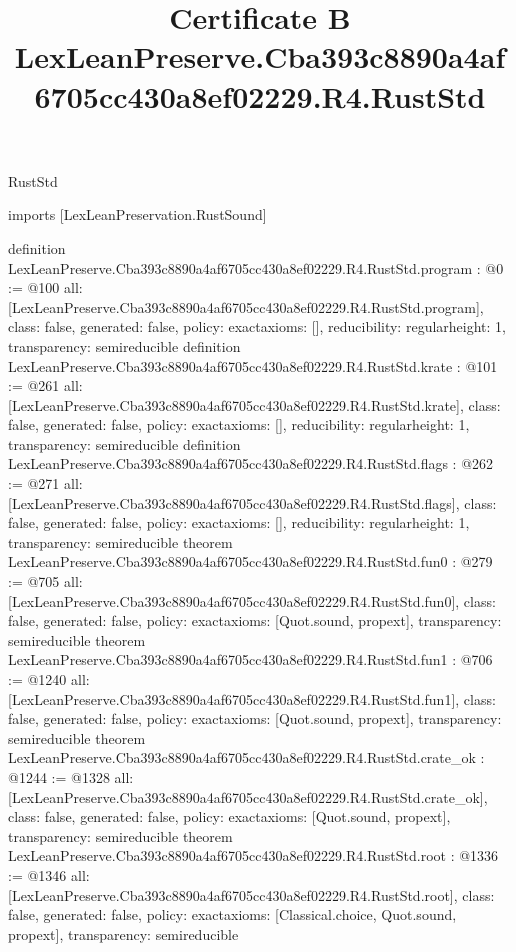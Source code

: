 \begin{lexlean}{RustStd}
\title{Certificate B LexLeanPreserve.Cba393c8890a4af6705cc430a8ef02229.R4.RustStd}
\begin{coremodule}
imports [LexLeanPreservation.RustSound]

definition LexLeanPreserve.Cba393c8890a4af6705cc430a8ef02229.R4.RustStd.program : @0 := @100 {
  all: [LexLeanPreserve.Cba393c8890a4af6705cc430a8ef02229.R4.RustStd.program],
  class: false,
  generated: false,
  policy: exact{axioms: []},
  reducibility: regular{height: 1},
  transparency: semireducible
}
definition LexLeanPreserve.Cba393c8890a4af6705cc430a8ef02229.R4.RustStd.krate : @101 := @261 {
  all: [LexLeanPreserve.Cba393c8890a4af6705cc430a8ef02229.R4.RustStd.krate],
  class: false,
  generated: false,
  policy: exact{axioms: []},
  reducibility: regular{height: 1},
  transparency: semireducible
}
definition LexLeanPreserve.Cba393c8890a4af6705cc430a8ef02229.R4.RustStd.flags : @262 := @271 {
  all: [LexLeanPreserve.Cba393c8890a4af6705cc430a8ef02229.R4.RustStd.flags],
  class: false,
  generated: false,
  policy: exact{axioms: []},
  reducibility: regular{height: 1},
  transparency: semireducible
}
theorem LexLeanPreserve.Cba393c8890a4af6705cc430a8ef02229.R4.RustStd.fun0 : @279 := @705 {
  all: [LexLeanPreserve.Cba393c8890a4af6705cc430a8ef02229.R4.RustStd.fun0],
  class: false,
  generated: false,
  policy: exact{axioms: [Quot.sound, propext]},
  transparency: semireducible
}
theorem LexLeanPreserve.Cba393c8890a4af6705cc430a8ef02229.R4.RustStd.fun1 : @706 := @1240 {
  all: [LexLeanPreserve.Cba393c8890a4af6705cc430a8ef02229.R4.RustStd.fun1],
  class: false,
  generated: false,
  policy: exact{axioms: [Quot.sound, propext]},
  transparency: semireducible
}
theorem LexLeanPreserve.Cba393c8890a4af6705cc430a8ef02229.R4.RustStd.crate_ok : @1244 := @1328 {
  all: [LexLeanPreserve.Cba393c8890a4af6705cc430a8ef02229.R4.RustStd.crate_ok],
  class: false,
  generated: false,
  policy: exact{axioms: [Quot.sound, propext]},
  transparency: semireducible
}
theorem LexLeanPreserve.Cba393c8890a4af6705cc430a8ef02229.R4.RustStd.root : @1336 := @1346 {
  all: [LexLeanPreserve.Cba393c8890a4af6705cc430a8ef02229.R4.RustStd.root],
  class: false,
  generated: false,
  policy: exact{axioms: [Classical.choice, Quot.sound, propext]},
  transparency: semireducible
}


\end{coremodule}
\end{lexlean}
